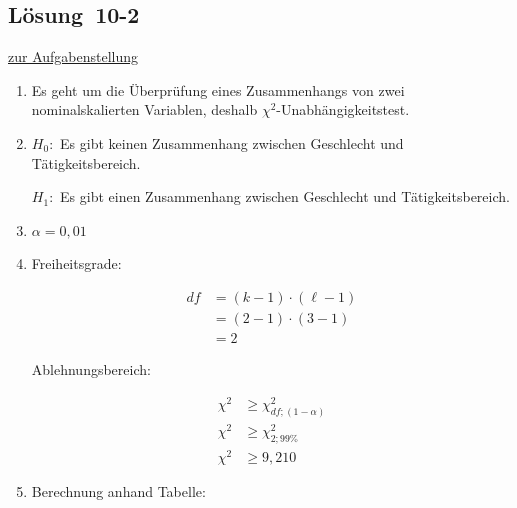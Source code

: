 \documentclass[
  11pt,
  ngerman,
  a4paper,
]{report}
\begin{document}
\hypertarget{loesung-10-2}{%
\subsection{Lösung~10-2}\label{loesung-10-2}}

\protect\hyperlink{aufgabe-10-2}{zur Aufgabenstellung}

\begin{enumerate}
\def\labelenumi{\alph{enumi})}
\item
  Es geht um die Überprüfung eines Zusammenhangs von zwei nominalskalierten Variablen, deshalb \(\chi^2\)-Unabhängigkeitstest.
\item
  \(H_0:\) Es gibt keinen Zusammenhang zwischen Geschlecht und Tätigkeitsbereich.

  \(H_1:\) Es gibt einen Zusammenhang zwischen Geschlecht und Tätigkeitsbereich.
\item
  \(\alpha=0{,}01\)
\item
  Freiheitsgrade:

  \[
   \begin{aligned}
   \mathit{df} &= (k - 1) \cdot (\ell - 1)\\
    &= (2 - 1) \cdot (3 - 1)\\
   &=2
   \end{aligned}
   \]

  Ablehnungsbereich:

  \[
   \begin{aligned}
   \chi^2 &\geq \chi^2_{\mathit{df};(1-\alpha)}\\
   \chi^2 &\geq \chi^2_{2;99\%}\\
   \chi^2 &\geq 9{,}210
   \end{aligned}
   \]
\item
  Berechnung anhand Tabelle:


\end{enumerate}
\end{document}
